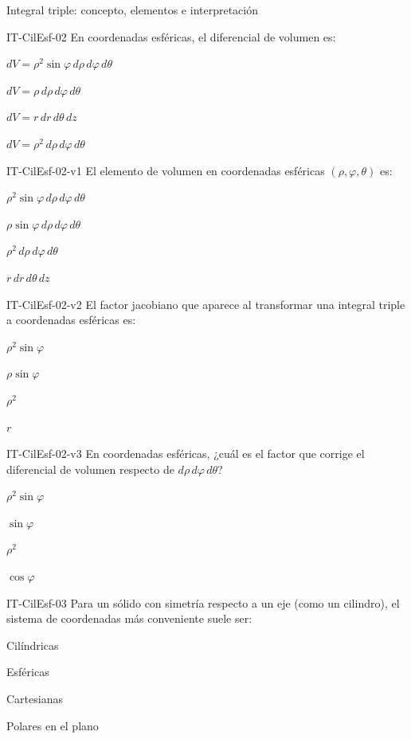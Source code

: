 \documentclass[a4,11pt]{aleph-notas}
\begin{document}
\begin{quiz}{Integral triple: concepto, elementos e interpretación}
\begin{multi}[]%
    {IT-CilEsf-02}
    En coordenadas esféricas, el diferencial de volumen es:
    \item* $dV = \rho^2\sin\varphi\,d\rho\,d\varphi\,d\theta$
    \item $dV = \rho\,d\rho\,d\varphi\,d\theta$
    \item $dV = r\,dr\,d\theta\,dz$
    \item $dV = \rho^2\,d\rho\,d\varphi\,d\theta$
\end{multi}

\begin{multi}[]%
    {IT-CilEsf-02-v1}
    El elemento de volumen en coordenadas esféricas $(\rho,\varphi,\theta)$ es:
    \item* $\rho^2\sin\varphi\,d\rho\,d\varphi\,d\theta$
    \item $\rho\sin\varphi\,d\rho\,d\varphi\,d\theta$
    \item $\rho^2\,d\rho\,d\varphi\,d\theta$
    \item $r\,dr\,d\theta\,dz$
\end{multi}

\begin{multi}[]%
    {IT-CilEsf-02-v2}
    El factor jacobiano que aparece al transformar una integral triple a coordenadas esféricas es:
    \item* $\rho^2\sin\varphi$
    \item $\rho\sin\varphi$
    \item $\rho^2$
    \item $r$
\end{multi}

\begin{multi}[]%
    {IT-CilEsf-02-v3}
    En coordenadas esféricas, ¿cuál es el factor que corrige el diferencial de volumen respecto de $d\rho\,d\varphi\,d\theta$?
    \item* $\rho^2\sin\varphi$
    \item $\sin\varphi$
    \item $\rho^2$
    \item $\cos\varphi$
\end{multi}

\begin{multi}[]%
    {IT-CilEsf-03}
    Para un sólido con simetría respecto a un eje (como un cilindro), el sistema de coordenadas más conveniente suele ser:
    \item* Cilíndricas
    \item Esféricas
    \item Cartesianas
    \item Polares en el plano
\end{multi}


\end{quiz}
\end{document}
